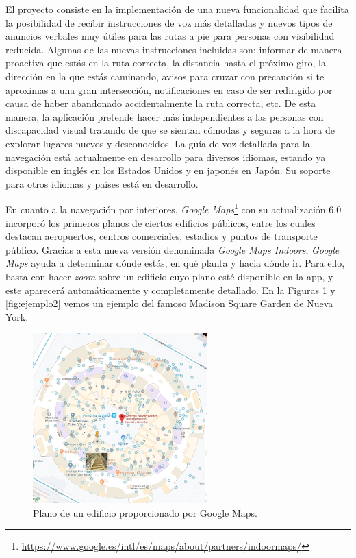 El proyecto consiste en la implementación de una nueva funcionalidad que facilita la posibilidad de recibir instrucciones de voz más detalladas y nuevos tipos de anuncios verbales muy útiles para las rutas a pie para personas con visibilidad reducida. Algunas de las nuevas instrucciones incluidas son: informar de manera proactiva que estás en la ruta correcta, la distancia hasta el próximo giro, la dirección en la que estás caminando, avisos para cruzar con precaución si te aproximas a una gran intersección, notificaciones en caso de ser redirigido por causa de haber abandonado accidentalmente la ruta correcta, etc. De esta manera, la aplicación pretende hacer más independientes a las personas con discapacidad visual tratando de que se sientan cómodas y seguras a la hora de explorar lugares nuevos y desconocidos. La guía de voz detallada para la navegación está actualmente en desarrollo para diversos idiomas, estando ya disponible en inglés en los Estados Unidos y en japonés en Japón. Su soporte para otros idiomas y países está en desarrollo.

En cuanto a la navegación por interiores, \textit{Google Maps}\footnote{\url{https://www.google.es/intl/es/maps/about/partners/indoormaps/}} con su actualización $6.0$ incorporó los primeros planos de ciertos edificios públicos, entre los cuales destacan aeropuertos, centros comerciales, estadios y puntos de transporte público. Gracias a esta nueva versión denominada \textit{Google Maps Indoors}, \textit{Google Maps} ayuda a determinar dónde estás, en qué planta y hacia dónde ir. Para ello, basta con hacer \textit{zoom} sobre un edificio cuyo plano esté disponible en la app, y este aparecerá automáticamente y completamente detallado. En la Figuras \ref{fig:ejemplo} y \ref{fig:ejemplo2} vemos un ejemplo del famoso Madison Square Garden de Nueva York.


 

\begin{figure}[t]
	\centering
	\includegraphics[width=0.6\textwidth]{Imagenes/Estadodelacuestion/MadSq2}
	\caption{Plano de un edificio proporcionado por Google Maps.}
	\label{fig:ejemplo}
\end{figure}

